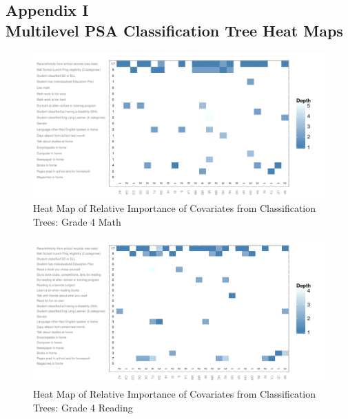 \documentclass[letterpaper,12p,twoside]{article} %
\begin{document}
%
%
%
%



\clearpage
{}
\subsection*{Appendix I\\Multilevel PSA Classification Tree Heat Maps}
\label{appendixtree}

\begin{figure}[h!]
\begin{center}
\includegraphics[height=.37\textheight]{../Figures2009/g4math-mlpsa-ctree-heat.pdf}
\caption{Heat Map of Relative Importance of Covariates from Classification Trees: Grade 4 Math}
\label{fig:g4math-mlpsa-ctree-heat}
\end{center}
\end{figure}

\begin{figure}[h!]
\begin{center}
\includegraphics[height=.37\textheight]{../Figures2009/g4read-mlpsa-ctree-heat.pdf}
\caption{Heat Map of Relative Importance of Covariates from Classification Trees: Grade 4 Reading}
\label{fig:g4read-mlpsa-ctree-heat}
\end{center}
\end{figure}
\end{document}
